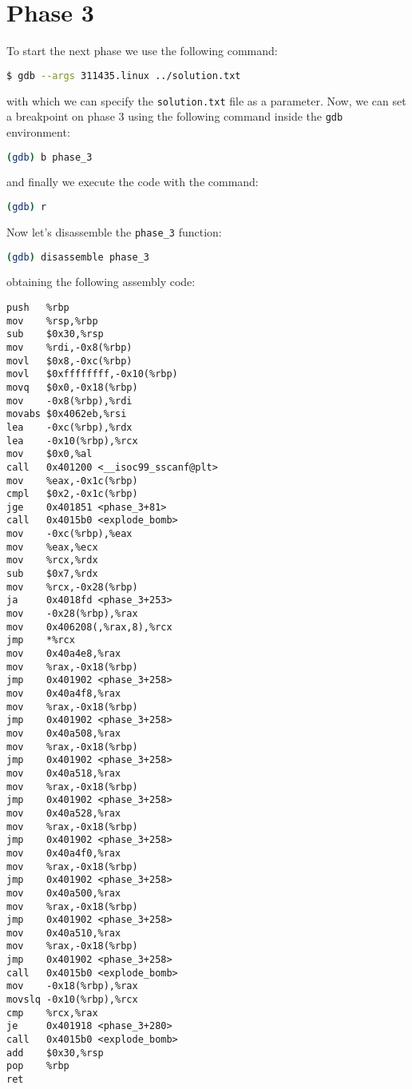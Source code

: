 \documentclass[a4paper,12pt]{report}  %
\newcommand{\lstinlinebg}[1]{\colorbox{backcolour}{\lstinline|#1|}}
\begin{document}
\section{Phase 3}
To start the next phase we use the following command:
\begin{lstlisting}[language=bash,numbers=none]
$ gdb --args 311435.linux ../solution.txt
\end{lstlisting}
with which we can specify the \lstinlinebg{solution.txt} file as a parameter.
Now, we can set a breakpoint on phase 3 using the following command inside the \lstinlinebg{gdb} environment:
\begin{lstlisting}[language=bash, numbers=none]
(gdb) b phase_3
\end{lstlisting}
and finally we execute the code with the command:
\begin{lstlisting}[language=bash, numbers=none]
(gdb) r
\end{lstlisting}
Now let's disassemble the \lstinlinebg{phase_3} function:
\begin{lstlisting}[language=bash, numbers=none]
(gdb) disassemble phase_3
\end{lstlisting}
obtaining the following assembly code:
\begin{lstlisting}[language=x86_64]
push   %rbp
mov    %rsp,%rbp
sub    $0x30,%rsp
mov    %rdi,-0x8(%rbp)
movl   $0x8,-0xc(%rbp)
movl   $0xffffffff,-0x10(%rbp)
movq   $0x0,-0x18(%rbp)
mov    -0x8(%rbp),%rdi
movabs $0x4062eb,%rsi
lea    -0xc(%rbp),%rdx
lea    -0x10(%rbp),%rcx
mov    $0x0,%al
call   0x401200 <__isoc99_sscanf@plt>
mov    %eax,-0x1c(%rbp)
cmpl   $0x2,-0x1c(%rbp)
jge    0x401851 <phase_3+81>
call   0x4015b0 <explode_bomb>
mov    -0xc(%rbp),%eax
mov    %eax,%ecx
mov    %rcx,%rdx
sub    $0x7,%rdx
mov    %rcx,-0x28(%rbp)
ja     0x4018fd <phase_3+253>
mov    -0x28(%rbp),%rax
mov    0x406208(,%rax,8),%rcx
jmp    *%rcx
mov    0x40a4e8,%rax
mov    %rax,-0x18(%rbp)
jmp    0x401902 <phase_3+258>
mov    0x40a4f8,%rax
mov    %rax,-0x18(%rbp)
jmp    0x401902 <phase_3+258>
mov    0x40a508,%rax
mov    %rax,-0x18(%rbp)
jmp    0x401902 <phase_3+258>
mov    0x40a518,%rax
mov    %rax,-0x18(%rbp)
jmp    0x401902 <phase_3+258>
mov    0x40a528,%rax
mov    %rax,-0x18(%rbp)
jmp    0x401902 <phase_3+258>
mov    0x40a4f0,%rax
mov    %rax,-0x18(%rbp)
jmp    0x401902 <phase_3+258>
mov    0x40a500,%rax
mov    %rax,-0x18(%rbp)
jmp    0x401902 <phase_3+258>
mov    0x40a510,%rax
mov    %rax,-0x18(%rbp)
jmp    0x401902 <phase_3+258>
call   0x4015b0 <explode_bomb>
mov    -0x18(%rbp),%rax
movslq -0x10(%rbp),%rcx
cmp    %rcx,%rax
je     0x401918 <phase_3+280>
call   0x4015b0 <explode_bomb>
add    $0x30,%rsp
pop    %rbp
ret
\end{lstlisting}
\end{document}
